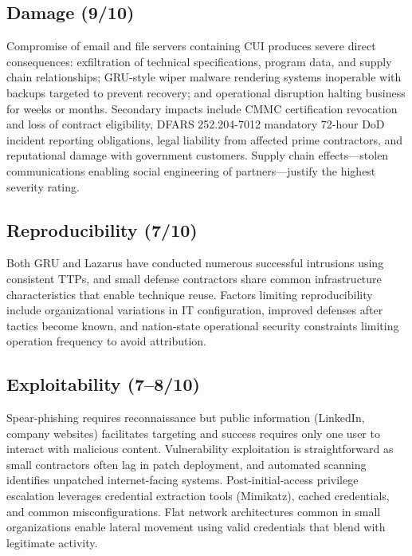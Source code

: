 \documentclass[sigconf,nonacm]{acmart}
\begin{document}
\subsection{Damage (9/10)}

Compromise of email and file servers containing CUI produces severe direct consequences:
exfiltration of technical specifications, program data, and supply chain relationships;
GRU-style wiper malware rendering systems inoperable with backups targeted to prevent
recovery; and operational disruption halting business for weeks or months. Secondary
impacts include CMMC certification revocation and loss of contract eligibility, DFARS
252.204-7012 mandatory 72-hour DoD incident reporting obligations, legal liability from
affected prime contractors, and reputational damage with government customers. Supply
chain effects---stolen communications enabling social engineering of partners---justify
the highest severity rating.

\subsection{Reproducibility (7/10)}

Both GRU and Lazarus have conducted numerous successful intrusions using consistent TTPs,
and small defense contractors share common infrastructure characteristics that enable
technique reuse. Factors limiting reproducibility include organizational variations in
IT configuration, improved defenses after tactics become known, and nation-state
operational security constraints limiting operation frequency to avoid attribution.

\subsection{Exploitability (7--8/10)}

Spear-phishing requires reconnaissance but public information (LinkedIn, company
websites) facilitates targeting and success requires only one user to interact with
malicious content. Vulnerability exploitation is straightforward as small contractors
often lag in patch deployment, and automated scanning identifies unpatched
internet-facing systems. Post-initial-access privilege escalation leverages credential
extraction tools (Mimikatz), cached credentials, and common misconfigurations. Flat
network architectures common in small organizations enable lateral movement using valid
credentials that blend with legitimate activity.
\end{document}
